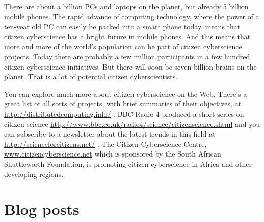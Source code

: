 There are about a billion PCs and laptops on the planet, but already 5 billion mobile phones. The rapid advance of computing technology, where the power of a ten-year old PC can easily be packed into a smart phone today, means that citizen cyberscience has a bright future in mobile phones. And this means that more and more of the world’s population can be part of citizen cyberscience projects. Today there are probably a few million participants in a few hundred citizen cyberscience initiatives. But there will soon be seven billion brains on the planet. That is a lot of potential citizen cyberscientists. 

You can explore much more about citizen cyberscience on the Web. There’s a great list of all sorts of projects, with brief summaries of their objectives, at \underline{http://distributedcomputing.info/} . BBC Radio 4 produced a short series on citizen science \underline{http://www.bbc.co.uk/radio4/science/citizenscience.shtml}  and you can subscribe to a newsletter about the latest trends in this field at \underline{http://scienceforcitizens.net/}  . The Citizen Cyberscience Centre, \underline{www.citizencyberscience.net}  which is sponsored by the South African Shuttleworth Foundation, is promoting citizen cyberscience in Africa and other developing regions.

\section{Blog posts}

